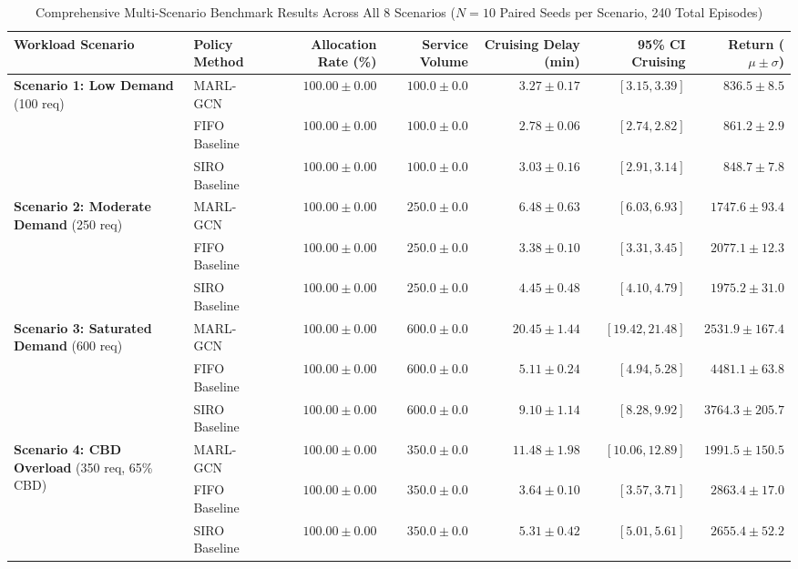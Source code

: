 \documentclass[journal]{IEEEtran}
\begin{document}
\begin{table}[t]
\caption{Comprehensive Multi-Scenario Benchmark Results Across All 8 Scenarios ($N=10$ Paired Seeds per Scenario, 240 Total Episodes)}
\label{tab:benchmarks_summary}
\centering
\begin{tabular}{llrrrrr}
\toprule
\textbf{Workload Scenario} & \textbf{Policy Method} & \textbf{Allocation Rate (\%)} & \textbf{Service Volume} & \textbf{Cruising Delay (min)} & \textbf{95\% CI Cruising} & \textbf{Return ($\mu \pm \sigma$)} \\
\midrule
\multirow{3}{*}{\textbf{Scenario 1: Low Demand} (100 req)} 
& MARL-GCN & $100.00 \pm 0.00$ & $100.0 \pm 0.0$ & $3.27 \pm 0.17$ & $[3.15, 3.39]$ & $836.5 \pm 8.5$ \\
& FIFO Baseline & $100.00 \pm 0.00$ & $100.0 \pm 0.0$ & $2.78 \pm 0.06$ & $[2.74, 2.82]$ & $861.2 \pm 2.9$ \\
& SIRO Baseline & $100.00 \pm 0.00$ & $100.0 \pm 0.0$ & $3.03 \pm 0.16$ & $[2.91, 3.14]$ & $848.7 \pm 7.8$ \\
\midrule
\multirow{3}{*}{\textbf{Scenario 2: Moderate Demand} (250 req)} 
& MARL-GCN & $100.00 \pm 0.00$ & $250.0 \pm 0.0$ & $6.48 \pm 0.63$ & $[6.03, 6.93]$ & $1747.6 \pm 93.4$ \\
& FIFO Baseline & $100.00 \pm 0.00$ & $250.0 \pm 0.0$ & $3.38 \pm 0.10$ & $[3.31, 3.45]$ & $2077.1 \pm 12.3$ \\
& SIRO Baseline & $100.00 \pm 0.00$ & $250.0 \pm 0.0$ & $4.45 \pm 0.48$ & $[4.10, 4.79]$ & $1975.2 \pm 31.0$ \\
\midrule
\multirow{3}{*}{\textbf{Scenario 3: Saturated Demand} (600 req)} 
& MARL-GCN & $100.00 \pm 0.00$ & $600.0 \pm 0.0$ & $20.45 \pm 1.44$ & $[19.42, 21.48]$ & $2531.9 \pm 167.4$ \\
& FIFO Baseline & $100.00 \pm 0.00$ & $600.0 \pm 0.0$ & $5.11 \pm 0.24$ & $[4.94, 5.28]$ & $4481.1 \pm 63.8$ \\
& SIRO Baseline & $100.00 \pm 0.00$ & $600.0 \pm 0.0$ & $9.10 \pm 1.14$ & $[8.28, 9.92]$ & $3764.3 \pm 205.7$ \\
\midrule
\multirow{3}{*}{\textbf{Scenario 4: CBD Overload} (350 req, 65\% CBD)} 
& MARL-GCN & $100.00 \pm 0.00$ & $350.0 \pm 0.0$ & $11.48 \pm 1.98$ & $[10.06, 12.89]$ & $1991.5 \pm 150.5$ \\
& FIFO Baseline & $100.00 \pm 0.00$ & $350.0 \pm 0.0$ & $3.64 \pm 0.10$ & $[3.57, 3.71]$ & $2863.4 \pm 17.0$ \\
& SIRO Baseline & $100.00 \pm 0.00$ & $350.0 \pm 0.0$ & $5.31 \pm 0.42$ & $[5.01, 5.61]$ & $2655.4 \pm 52.2$ \\

\end{tabular}
\end{table}
\end{document}
